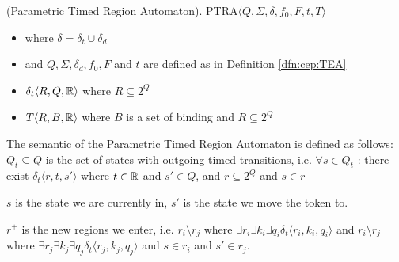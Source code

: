 			
			
			\begin{dfn}
				(Parametric Timed Region Automaton).
				PTRA$\langle Q, \Sigma, \delta, f_0, F, t, T \rangle$
				\begin{itemize}
					\item where $\delta = \delta_t \cup \delta_d$
					\item and $Q, \Sigma, \delta_d, f_0, F$ and $t$ are defined as in Definition \ref{dfn:cep:TEA}
					\item $\delta_t \langle R, Q, \mathbb{R} \rangle $ where $R \subseteq 2^Q$
					\item $T\langle R, B, \mathbb{R} \rangle$ where $B$ is a set of binding and  $R \subseteq 2^Q$

				\end{itemize}
				
			\end{dfn}
			
			The semantic of the Parametric Timed Region Automaton is defined as follows:
			$Q_t \subseteq Q$ is the set of states with outgoing timed transitions, i.e. $\forall s \in Q_t$ : there exist $ \delta_t\langle r, t, s' \rangle$ where $t \in \mathbb{R}$ and $s' \in Q$, and $r \subseteq 2^Q$ and $s \in r$
			
			$s$ is the state we are currently in, $s'$ is the state we move the token to.
			
			$r^+$ is the new regions we enter, i.e. $ r_i \setminus r_j $ where $ \exists r_i \exists k_i \exists q_i \delta_t\langle r_i,k_i,q_i \rangle$ and $ r_i \setminus r_j $ where $ \exists r_j \exists k_j \exists q_j \delta_t\langle r_j,k_j,q_j \rangle$ and $ s \in r_i$ and $s' \in r_j$.
			
